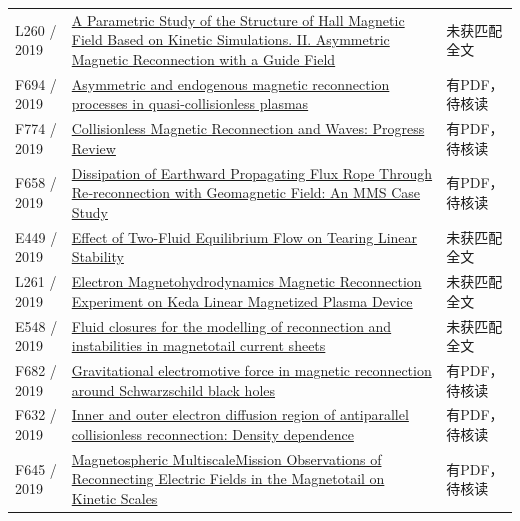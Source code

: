 \documentclass[UTF8,a4paper,11pt,openany,fontset=fandol]{ctexbook}
\begin{document}
\begin{longtable}{P{24mm}P{97mm}P{27mm}}
L260 / 2019 & \href{https://doi.org/10.3847/1538-4357/ab35d9}{A Parametric Study of the Structure of Hall Magnetic Field Based on Kinetic Simulations. II. Asymmetric Magnetic Reconnection with a Guide Field} & 未获匹配全文\\

F694 / 2019 & \href{https://doi.org/10.1063/1.5086170}{Asymmetric and endogenous magnetic reconnection processes in quasi-collisionless plasmas} & 有PDF，待核读\\

F774 / 2019 & \href{https://doi.org/10.3389/fspas.2019.00070}{Collisionless Magnetic Reconnection and Waves: Progress Review} & 有PDF，待核读\\

F658 / 2019 & \href{https://doi.org/10.1029/2018ja026451}{Dissipation of Earthward Propagating Flux Rope Through Re‐reconnection with Geomagnetic Field: An MMS Case Study} & 有PDF，待核读\\

E449 / 2019 & \href{http://ui.adsabs.harvard.edu/abs/2019APS..DPPP10083G/abstract}{Effect of Two-Fluid Equilibrium Flow on Tearing Linear Stability} & 未获匹配全文\\

L261 / 2019 & \href{https://doi.org/10.1088/0256-307x/36/1/015201}{Electron Magnetohydrodynamics Magnetic Reconnection Experiment on Keda Linear Magnetized Plasma Device} & 未获匹配全文\\

E548 / 2019 & \href{https://dataspace.princeton.edu/handle/88435/dsp015d86p299f}{Fluid closures for the modelling of reconnection and instabilities in magnetotail current sheets} & 未获匹配全文\\

F682 / 2019 & \href{https://doi.org/10.1103/physrevd.99.063017}{Gravitational electromotive force in magnetic reconnection around Schwarzschild black holes} & 有PDF，待核读\\

F632 / 2019 & \href{https://doi.org/10.1063/1.5109368}{Inner and outer electron diffusion region of antiparallel collisionless reconnection: Density dependence} & 有PDF，待核读\\

F645 / 2019 & \href{https://doi.org/10.1029/2019gl083782}{Magnetospheric MultiscaleMission Observations of Reconnecting Electric Fields in the Magnetotail on Kinetic Scales} & 有PDF，待核读\\


\end{longtable}
\end{document}
